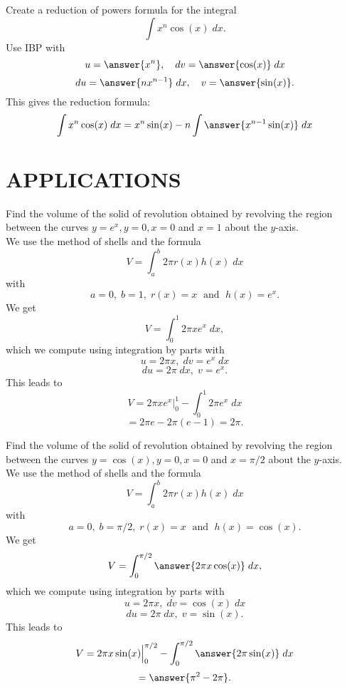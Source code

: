 \documentclass{ximera}
\begin{document}
\begin{problem}
Create a reduction of powers formula for the integral
\[
\int x^n\cos(x) \; dx.
\]
Use IBP with
\[
u = \answer{x^n}, \quad dv = \answer{\cos(x)} \; dx
\]
\[
du = \answer{nx^{n-1}}\; dx,  \quad v = \answer{\sin(x)}.
\]
This gives the reduction formula:
\[
\int x^n\cos(x) \; dx = x^n\sin(x) - n\int \answer{x^{n-1}\sin(x)} \; dx
\]
\end{problem}




\section{APPLICATIONS}

\begin{example}
Find the volume of the solid of revolution obtained by revolving the region between the curves $y = e^x, y = 0, x = 0$
and $x = 1$ about the $y$-axis.\\


We use the method of shells and the formula
\[
V = \int_a^b 2\pi r(x)h(x) \; dx
\]
with
\[
a = 0,\; b = 1, \; r(x) = x \; \text{ and } \; h(x) = e^x.
\]
We get
\[
V = \int_0^1 2\pi xe^x \; dx,
\]
which we compute using integration by parts with
\[
u = 2\pi x, \; dv = e^x \; dx
\]
\[
du = 2\pi \;dx, \; v = e^x.
\]
This leads to 
\[
V = 2\pi xe^x \Big|_0^1 - \int_0^1 2\pi e^x \; dx
\] 
\[
= 2\pi e - 2\pi (e-1) = 2\pi.
\]
\end{example} 

\begin{problem}
Find the volume of the solid of revolution obtained by revolving the region between the curves $y = \cos(x), y = 0, x = 0$
and $x = \pi/2$ about the $y$-axis.\\


We use the method of shells and the formula
\[
V = \int_a^b 2\pi r(x)h(x) \; dx
\]
with
\[
a = 0,\; b = \pi/2, \; r(x) = x \; \text{ and } \; h(x) = \cos(x).
\]
We get
\[
V = \int_0^{\pi/2} \answer{2\pi x \cos(x)} \; dx,
\]
which we compute using integration by parts with
\[
u = 2\pi x, \; dv = \cos(x) \; dx
\]
\[
du = 2\pi \;dx, \; v = \sin(x).
\]
This leads to 
\[
V = 2\pi x\sin(x) \Big|_0^{\pi/2} - \int_0^{\pi/2} \answer{2\pi \sin(x)} \; dx
\] 
\[
= \answer{\pi^2 - 2\pi}.
\]
\end{problem} 





\begin{center}
\begin{foldable}
\end{foldable}
\end{center}
\end{document}
